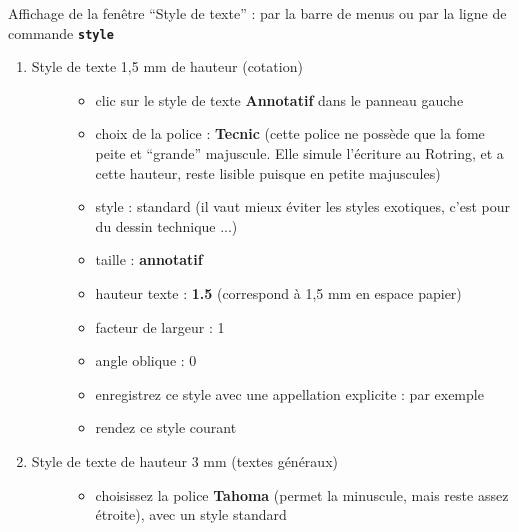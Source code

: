 \documentclass[a4paper,12pt,french]{sphinxmanual}
\begin{document}
Affichage de la fenêtre ``Style de texte'' : par la barre de menus  ou par la ligne de commande \textbf{\texttt{style}}
\begin{figure}[htbp]
\centering

\noindent{}
\end{figure}
\begin{enumerate}
\item {} \begin{description}
\item[{Style de texte 1,5 mm de hauteur (cotation)}] \leavevmode\begin{itemize}
\item {} 
clic sur le style de texte \textbf{Annotatif} dans le panneau gauche

\item {} 
choix de la police : \textbf{Tecnic} (cette police ne possède que la fome peite et ``grande'' majuscule. Elle simule l'écriture au Rotring, et a cette hauteur, reste lisible puisque en petite majuscules)

\item {} 
style : standard (il vaut mieux éviter les styles exotiques, c'est pour du dessin technique ...)

\item {} 
taille : \textbf{annotatif}

\item {} 
hauteur texte : \textbf{1.5} (correspond à 1,5 mm en espace papier)

\item {} 
facteur de largeur : 1

\item {} 
angle oblique : 0

\item {} 
enregistrez ce style avec une appellation explicite :  par exemple

\item {} 
rendez ce style courant

\end{itemize}

\end{description}

\item {} \begin{description}
\item[{Style de texte de hauteur 3 mm (textes généraux)}] \leavevmode\begin{itemize}
\item {} 
choisissez la police \textbf{Tahoma} (permet la minuscule, mais reste assez étroite), avec un style standard


\end{itemize}
\end{description}
\end{enumerate}
\end{document}
